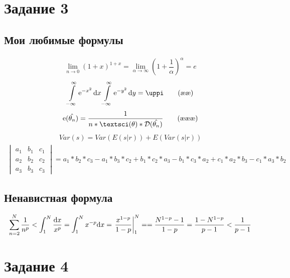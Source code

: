 \documentclass[10pt, a4paper]{article}  %
\begin{document}
\section*{Задание 3}
\subsection*{Мои любимые формулы}

 \begin{align}
 \lim_{n\to 0}(1+x)^{1+x}=\lim_{\alpha\to\infty}(1+\dfrac{1}{\alpha})^{\alpha}=e \tag{\ae}\label{aster1}
 \end{align}
 \begin{align}
\int\limits_{\--\infty}^\infty\mathrm{e}^{-x^2}\,\mathrm{d}x\int\limits_{\--\infty}^\infty\mathrm{e}^{-y^2}\,\mathrm{d}y=\uppi \tag{\ae\ae}\label{aster2}
 \end{align}
 \begin{align}
\mathrm{e}(\hat{\theta_n})=\dfrac{1}{n*\textsci(\theta)*\mathcal{D}(\hat{\theta_n})} \tag{\ae\ae\ae}\label{aster3}
 \end{align}
 \begin{align}
Var(s)=Var(E(s|r))+E(Var(s|r))  \tag{\ae\ae\ae\ae}\label{aster4}
 \end{align}
 \begin{align}
\begin{vmatrix} 
a_1 & b_1 & c_1 \\ 
a_2 & b_2 & c_2\\ 
a_3 & b_3 & c_3 \end{vmatrix}=a_1*b_2*c_3−a_1*b_3*c_2+b_1*c_2*a_3 − b_1*c_3*a_2+ c_1*a_2* b_3−c_1* a_3* b_2  \tag{\ae\ae\ae\ae\ae}\label{aster5}
 \end{align} 
 
\subsection*{Ненавистная формула}
 \begin{equation*}
 \sum_{n=2}^{N} \dfrac{1}{n^p} < \int_1^N \dfrac{\mathrm{d}x}{x^p}=\int_1^N x^{-p}\mathrm{d}x=\left.\dfrac{x^{1-p}}{1-p}\right|_1^N =$$
$$ = \dfrac{N^{1-p}-1}{1-p}=\dfrac{1-N^{1-p}}{p-1}<\dfrac{1}{p-1} 
 \end{equation*} 
 

\section*{Задание 4}
\end{document}
